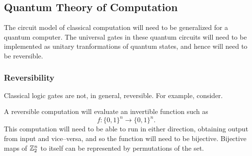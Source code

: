 



\subsection{Quantum Theory of Computation}

The circuit model of classical computation will need to be generalized
for a quantum computer.  The universal gates in these quantum circuits
will need to be implemented as unitary tranformations of quantum
states, and hence will need to be reversible.

\subsubsection{Reversibility}

Classical logic gates are not, in general, reversible.
For example, consider.

A reversible computation will evaluate an invertible function
such as
\begin{equation}
f\colon\lbrace 0,1\rbrace^n \to\lbrace 0,1\rbrace^n.
\end{equation}
This computation will need to be able to run in either direction,
obtaining output from input and vice--versa, and so the function
will need to be bijective.  Bijective maps of ${\mathbb{Z}}_2^n$ to itself
can be represented by permutations of the set.

